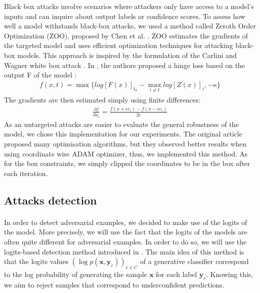 \documentclass[11pt,twocolumn,letterpaper]{article}
\begin{document}
Black box attacks involve scenarios where attackers only have access to a model's inputs and can inquire about output labels or confidence scores. To assess how well a model withstands black-box attacks, we used a method called Zeroth Order Optimization (ZOO), proposed by Chen et al. \cite{Chen_2017}. ZOO estimates the gradients of the targeted model and uses efficient optimization techniques for attacking black-box models.
This approach is inspired by the formulation of the Carlini and Wagner white box attack \cite{robustness}.
In \cite{Chen_2017}, the authors proposed a hinge loss based on the output F of the model :
\begin{align*}
    f(x,t) = \max \{log[F(x)]_{t_0} - \max_{i \neq t}log[Z(x)]_i, -\kappa \}
\end{align*}
The gradients are then estimated simply using finite differences:
\begin{align*}
    \frac{\partial f}{\partial x_i} = \frac{f(x + \epsilon e_i) - f(x - \epsilon e_i)}{2 \epsilon}
\end{align*}
As an untargeted attacks are easier to evaluate the general robustness of the model, we chose this implementation for our experiments. The original article proposed many optimisation algorithms, but they observed better results when using coordinate wise ADAM optimizer, thus, we implemented this method. As for the box constraints, we simply clipped the coordinates to be in the box after each iteration.

\subsection{Attacks detection}

\paragraph{} In order to detect adversarial examples, we decided to make use of the logits of the model. More precisely, we will use the fact that the logits of the models are often quite different for adversarial examples. In order to do so, we will use the logits-based detection method introduced in \cite{main_paper}. The main idea of this method is that the logits values $(\log{p(\bm{x}, \bm{y}_c)})_{c \in C}$ of a generative classifier correspond to the log probability of generating the sample $\bm{x}$ for each label $\bm{y}_c$. Knowing this, we aim to reject samples that correspond to underconfident predictions. 
\end{document}
